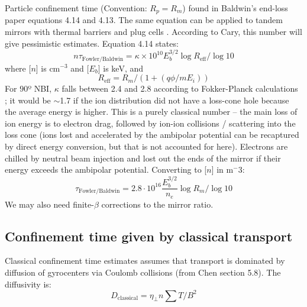 Particle confinement time (Convention: $R_p = R_m$) found in Baldwin's end-loss paper \cite{baldwin_end-loss_1977} equations 4.14 and 4.13. The same equation can be applied to tandem mirrors with thermal barriers and plug cells \cite{PhysRevLett.43.1318}. According to Cary, this number will give pessimistic estimates.
Equation 4.14 \cite{baldwin_end-loss_1977} states:
\begin{equation}
     n\tau_{\text{Fowler/Baldwin}} = \kappa \times 10^{10} {E_b^{3/2}} \log{R_{\text{eff}}} / \log{10}
\end{equation}
where [$n$] is cm$^{-3}$ and [$E_b$] is keV, and
\begin{equation}
    R_{\text{eff}} = R_m / \left( 1 + (q \phi / m E_i) \right)
\end{equation}
For $90$º NBI, $\kappa$ falls between 2.4 and 2.8 according to Fokker-Planck calculations \cite{baldwin_end-loss_1977}; it would be $\sim$1.7 if the ion distribution did not have a loss-cone hole because the average energy is higher.   This is a purely classical number -- the main loss of ion energy is to electron drag, followed by ion-ion collisions / scattering into the loss cone (ions lost and accelerated by the ambipolar potential can be recaptured by direct energy conversion, but that is not accounted for here). Electrons are chilled by neutral beam injection and lost out the ends of the mirror if their energy exceeds the ambipolar potential.
Converting to [$n$] in m${^-3}$:
\begin{equation}
    \tau_{\text{Fowler/Baldwin}} = 2.8 \cdot 10^{16} \frac{E_b^{3/2}}{n_e} \log R_m / \log{10}
\end{equation}
We may also need finite-$\beta$ corrections to the mirror ratio.

\subsection{Confinement time given by classical transport}
Classical confinement time estimates assumes that transport is dominated by diffusion of gyrocenters via Coulomb collisions (from Chen section 5.8\cite{Chen_3rd_ed}). The diffusivity is:
\begin{equation}
    D_\text{classical} = \eta_\perp n \sum T / B^2
\end{equation}

